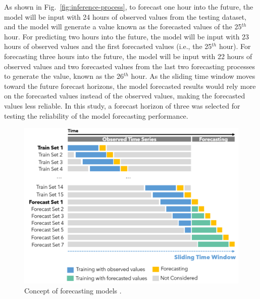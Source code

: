 As shown in Fig.~\ref{fig:inference-process}, to forecast one hour into the future, the model will be input with 24 hours of observed values from the testing dataset, and the model will generate a value known as the forecasted values of the 25$^{th}$ hour. For predicting two hours into the future, the model will be input with 23 hours of observed values and the first forecasted values (i.e., the 25$^{th}$ hour). For forecasting three hours into the future, the model will be input with 22 hours of observed values and two forecasted values from the last two forecasting processes to generate the value, known as the 26$^{th}$ hour. As the sliding time window moves toward the future forecast horizons, the model forecasted results would rely more on the forecasted values instead of the observed values, making the forecasted values less reliable. In this study, a forecast horizon of three was selected for testing the reliability of the model forecasting performance.

\begin{figure}[!ht]
  \centering
  \includegraphics[width=0.9\columnwidth]{imgs/forecast-concept.png}
  \caption{Concept of forecasting models \citep{liuTimeSeriesForecasting2020}.}
  \label{fig:forecast-concept}
\end{figure}

